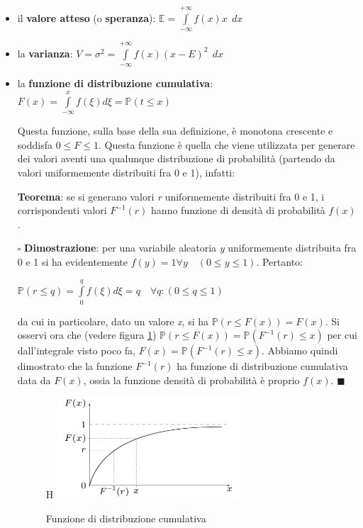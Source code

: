 \documentclass[11pt]{book}
\begin{document}
\begin{itemize}
\item il {\bf valore atteso} (o {\bf speranza}): $\mathbb{E} =
  \int\limits_{-\infty}^{+\infty} f(x)x\phantom{,}dx$

\item la {\bf varianza}: $V = \sigma^2 = \int\limits_{-\infty}^{+\infty}
  f(x)(x-E)^2\phantom{,}dx$

\item la {\bf funzione di distribuzione cumulativa}: $F(x) =
  \int\limits_{-\infty}^{x} f(\xi)d\xi = \mathbb{P}(t\leq x)$

  Questa funzione, sulla base della sua definizione, \`e monotona
  crescente e soddisfa $0 \leq F \leq 1$. Questa funzione \`e quella
  che viene utilizzata per generare dei valori aventi una qualunque
  distribuzione di probabilit\`a (partendo da valori uniformemente
  distribuiti fra 0 e 1), infatti:
  
  {\bf Teorema}: se si generano valori {\em r} uniformemente
  distribuiti fra 0 e 1, i corrispondenti valori $F^{-1}(r)$ hanno
  funzione di densit\`a di probabilit\`a $f(x)$.

  \vspace{11pt}
  $\square$ {\bf Dimostrazione}: per una variabile aleatoria {\em y}
  uniformemente distribuita fra 0 e 1 si ha evidentemente $f(y) = 1
  \forall y\quad (0\leq y \leq 1)$. Pertanto:
  
  \begin{center}
    $\mathbb{P}(r \leq q) = \int\limits_{0}^q f(\xi)d\xi = q \quad
    \forall q : (0 \leq q \leq 1)$
  \end{center}

  da cui in particolare, dato un valore {\em x}, si ha $\mathbb{P}(r
  \leq F(x)) = F(x)$. Si osservi ora che (vedere figura
  \ref{cap11fig1}) $\mathbb{P}(r \leq F(x)) = \mathbb{P}(F^{-1}(r)\leq
  x)$ per cui dall'integrale visto poco fa, $F(x) =
  \mathbb{P}(F^{-1}(r) \leq x)$. Abbiamo quindi dimostrato che la
  funzione $F^{-1}(r)$ ha funzione di distribuzione cumulativa data da
  $F(x)$, ossia la funzione densit\`a di probabilit\`a \`e proprio
  $f(x)$. $\blacksquare$
  \vspace{11pt}

  \begin{figure}{H}
  \centering
  \includegraphics[width=0.65\textwidth]{images/cap11fig1.png}
  \caption{Funzione di distribuzione cumulativa}
  \label{cap11fig1}
  \end{figure}

\end{itemize}
\end{document}
